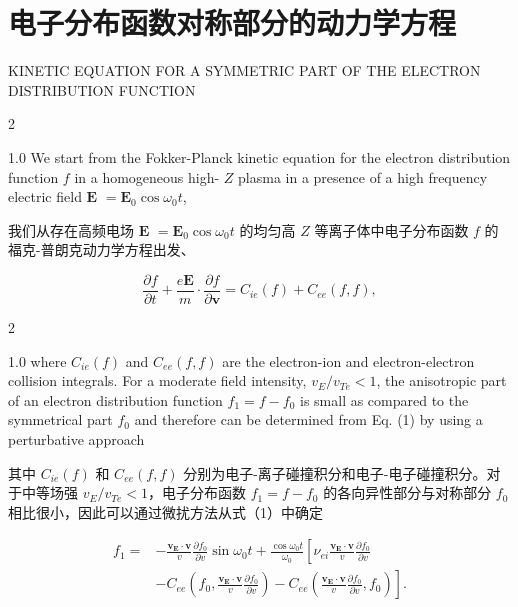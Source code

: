 \documentclass[oneside,onecolumn]{article}
\newcommand\enzhbox[2]{
  	\quad\par \begin{paracol}{2} \colseprulecolor{black} 
  			\begin{spacing}{1.0}
  				\footnotesize  #1
  			\end{spacing}
  		\switchcolumn[1] 
  		#2
  	\end{paracol} 
  }
\begin{document}
\begin{sloppypar}
{}
  
  \section{电子分布函数对称部分的动力学方程}

 {  \small KINETIC EQUATION FOR A SYMMETRIC PART OF THE ELECTRON DISTRIBUTION FUNCTION\par }
 
\enzhbox{   We start from the Fokker-Planck kinetic equation for the electron distribution function $f$ in a homogeneous high- $Z$ plasma in a presence of a high frequency electric field $\mathbf{E}$ $=\mathbf{E}_{0} \cos \omega_{0} t$,
}{
我们从存在高频电场 $\mathbf{E}$ $=\mathbf{E}_{0} \cos \omega_{0} t$ 的均匀高 $Z$ 等离子体中电子分布函数 $f$ 的福克-普朗克动力学方程出发、

}
  
  \begin{dmath}[compact]
  \frac{\partial f}{\partial t}+\frac{e \mathbf{E}}{m} \cdot \frac{\partial f}{\partial \mathbf{v}}=C_{i e}(f)+C_{e e}(f, f),
  \end{dmath}
  
 
\enzhbox{   where $C_{i e}(f)$ and $C_{e e}(f, f)$ are the electron-ion and electron-electron collision integrals. For a moderate field intensity, $v_{E} / v_{T e}<1$, the anisotropic part of an electron distribution function $f_{1}=f-f_{0}$ is small as compared to the symmetrical part $f_{0}$ and therefore can be determined from Eq. (1) by using a perturbative approach
}{
其中 $C_{i e}(f)$ 和 $C_{e e}(f, f)$ 分别为电子-离子碰撞积分和电子-电子碰撞积分。对于中等场强 $v_{E} / v_{T e}<1$，电子分布函数 $f_{1}=f-f_{0}$ 的各向异性部分与对称部分 $f_{0}$ 相比很小，因此可以通过微扰方法从式（1）中确定

}
  
  \begin{dmath}[compact]
  \begin{aligned}
  f_{1}= & -\frac{\mathbf{v}_{\mathbf{E}} \cdot \mathbf{v}}{v} \frac{\partial f_{0}}{\partial v} \sin \omega_{0} t+\frac{\cos \omega_{0} t}{\omega_{0}}\left[\nu_{e i} \frac{\mathbf{v}_{\mathbf{E}} \cdot \mathbf{v}}{v} \frac{\partial f_{0}}{\partial v}\right. \\
  & \left.-C_{e e}\left(f_{0}, \frac{\mathbf{v}_{\mathbf{E}} \cdot \mathbf{v}}{v} \frac{\partial f_{0}}{\partial v}\right)-C_{e e}\left(\frac{\mathbf{v}_{\mathbf{E}} \cdot \mathbf{v}}{v} \frac{\partial f_{0}}{\partial v}, f_{0}\right)\right] .
  \end{aligned}
  \end{dmath}
  

\end{sloppypar}
\end{document}
